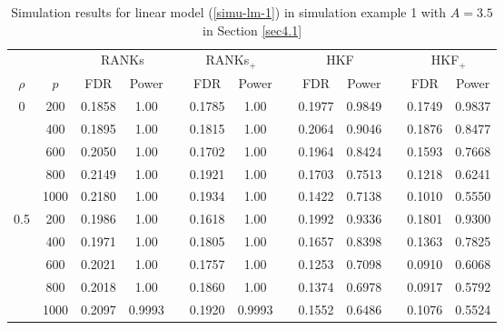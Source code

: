 \documentclass[11pt]{article}
\begin{document}
\begin{table}[htp!]
		\centering
		\caption{\label{tab3} Simulation results for linear model (\ref{simu-lm-1}) in simulation example 1 with $A=3.5$ in Section \ref{sec4.1}}
		\vskip0.2cm
		\tabcolsep 0.15cm

	\begin{tabular}{ccccccccccccc}
		\toprule
&		&  \multicolumn{2}{c}{RANKs}&&\multicolumn{2}{c}{RANKs$_+$} &&\multicolumn{2}{c}{HKF}&&\multicolumn{2}{c}{HKF$_+$}     \\
		\cline{3-4}\cline{6-7}\cline{9-10}\cline{12-13}
$\rho$	&	$ p$ &FDR & Power &  & FDR& Power && FDR & Power &  & FDR& Power  \\
		\hline
0 &			200  &0.1858 &1.00     &&0.1785 &1.00     &&0.1977  &0.9849  &&0.1749  &0.9837 \\
		&	400  &0.1895 &1.00     && 0.1815&1.00     &&0.2064  &0.9046  &&0.1876  &0.8477 \\
		&	600  &0.2050 &1.00     &&0.1702 &1.00     &&0.1964  &0.8424  &&0.1593  &0.7668 \\
		&	800  &0.2149 &1.00     &&0.1921 &1.00     &&0.1703  &0.7513  &&0.1218  &0.6241 \\
                & 1000      &0.2180 &1.00     &&0.1934 &1.00     &&0.1422  &0.7138  &&0.1010  &0.5550 \\
0.5&        200            &0.1986 &1.00     && 0.1618&1.00     &&0.1992  &0.9336  &&0.1801  &0.9300 \\
		&	400  &0.1971 &1.00     &&0.1805 &1.00     &&0.1657  & 0.8398 &&0.1363  & 0.7825 \\
		&	600  &0.2021 &1.00     &&0.1757 &1.00     &&0.1253  & 0.7098 &&0.0910  &0.6068  \\
		&	800  &0.2018 &1.00     &&0.1860 &1.00     &&0.1374  &0.6978  &&0.0917  &0.5792 \\
                   & 1000   &0.2097 &0.9993 &&0.1920 &0.9993 &&0.1552  &0.6486  &&0.1076  &0.5524 \\
		\bottomrule
	\end{tabular}
	\end{table}
\end{document}
